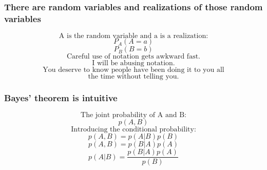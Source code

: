 \documentclass{beamer}
\begin{document}
\begin{frame}[t]
  \frametitle{There are random variables and realizations of those random variables}
  \begin{minipage}{0\linewidth}
\begin{flushleft}
\begin{equation*}
  \mbox{A is the random variable and a is a realization:}
\end{equation*}
\begin{equation*}
  P_A(A=a)
\end{equation*}
\pause
\begin{equation*}
  P_B(B=b)
\end{equation*}
\pause
\begin{equation*}
  \mbox{Careful use of notation gets awkward fast.}
\end{equation*}
\pause
\begin{equation*}
  \mbox{I will be abusing notation.}
\end{equation*}
\pause
\begin{equation*}
  \mbox{You deserve to know people have been doing it to you all}
\end{equation*}
\begin{equation*}
  \mbox{the time without telling you.}
\end{equation*}
\end{flushleft} 
\end{minipage}
\end{frame}

\begin{frame}[t]
  \frametitle{Bayes' theorem is intuitive}
  \begin{minipage}{0\linewidth}
\begin{flushleft}
\begin{equation*}
  \mbox{The joint probability of A and B:}
\end{equation*}
\begin{equation*}
  p(A,B)
\end{equation*}
\pause
\begin{equation*}
  \mbox{Introducing the conditional probability:}
\end{equation*}
\begin{equation*}
  p(A,B) = p(A|B) p(B)
\end{equation*}
\pause
\begin{equation*}
  p(A,B) = p(B|A) p(A)
\end{equation*}
\pause
\begin{equation*}
  p(A|B) = \frac{p(B|A) p(A)}{p(B)}
\end{equation*}
\end{flushleft} 
\end{minipage}
\end{frame}
\end{document}
